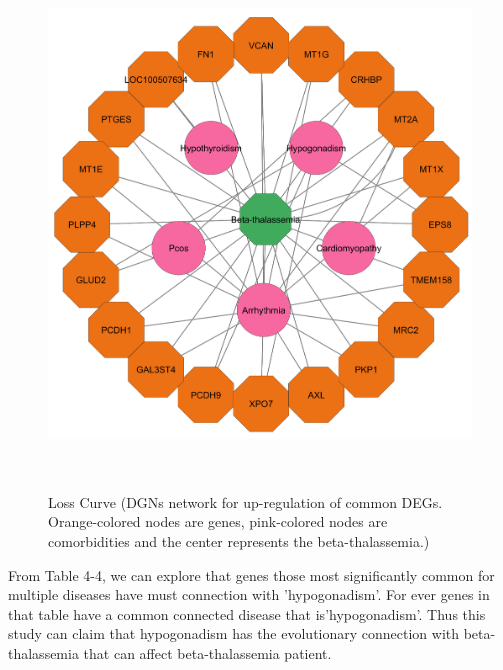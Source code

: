 \begin{figure}[H]
\centering
\includegraphics[height=14cm]{./fig/fig4_1.png} 
\centering
\caption{Loss Curve (DGNs network for up-regulation of common DEGs.  Orange-colored nodes are genes, pink-colored nodes are comorbidities and the center represents the beta-thalassemia.)}
\label{Loss_Curve}
\end{figure}

From Table 4-4, we can explore that genes those most significantly common for multiple diseases have must connection with 'hypogonadism'.  For ever genes in that table have a common connected disease that is'hypogonadism'. Thus this study can claim that hypogonadism has the evolutionary connection with beta-thalassemia that can affect beta-thalassemia patient.

